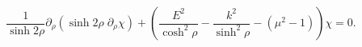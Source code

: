 \begin{equation}
\label{chiequ}
\frac{1}{\sinh 2\rho} \partial_{\rho}(\sinh 2\rho \;\partial_{\rho}
\chi) + \left( \frac{E^2}{\cosh^2 \rho} - \frac{k^2}{\sinh^2 \rho} -
(\mu^2 - 1) \right)\chi = 0.
\end{equation}

